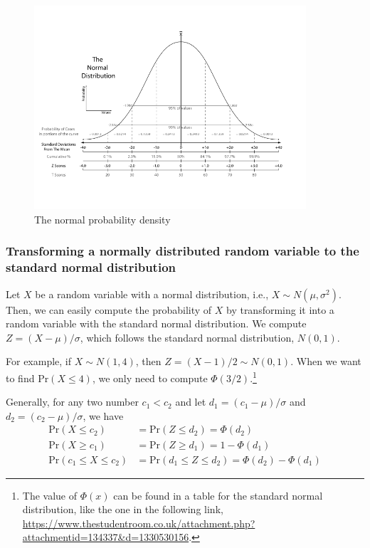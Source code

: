 \documentclass[a4paper,11pt]{article}
\begin{document}
\begin{figure}[htbp]
\centering
\includegraphics[width=0.9\textwidth]{figure/Normal-distribution-curve.png}
\caption{\label{fig:org2d3651f}
The normal probability density}
\end{figure}

\subsubsection*{Transforming a normally distributed random variable to the standard normal distribution}
\label{sec:org6cff76b}

Let \(X\) be a random variable with a normal distribution, i.e., \(X \sim
N(\mu, \sigma^2)\). Then, we can easily compute the probability of \(X\)
by transforming it into a random variable with the standard normal
distribution. We compute \(Z = (X-\mu)/\sigma\), which follows
the standard normal distribution, \(N(0, 1)\).

For example, if \(X \sim N(1, 4)\), then \(Z = (X-1)/2 \sim N(0,
1)\). When we want to find \(\mathrm{Pr}(X \leq 4)\), we only need to
compute \(\Phi(3/2)\).\footnote{The value of \(\Phi(x)\) can be found in a table for the standard
normal distribution, like the one in the following link,
\url{https://www.thestudentroom.co.uk/attachment.php?attachmentid=134337\&d=1330530156}.}

Generally, for any two number \(c_1 < c_2\) and let \(d_1 = (c_1 - \mu)/\sigma\) and
\(d_2 = (c_2 - \mu)/\sigma\), we have
\begin{align*}
\mathrm{Pr}(X \leq c_2) & = \mathrm{Pr}(Z \leq d_2) = \Phi(d_2) \\
\mathrm{Pr}(X \geq c_1) & = \mathrm{Pr}(Z \geq d_1) = 1 - \Phi(d_1) \\
\mathrm{Pr}(c_1 \leq X \leq c_2) & = \mathrm{Pr}(d_1 \leq Z \leq d_2) = \Phi(d_2) - \Phi(d_1)
\end{align*}
\end{document}
